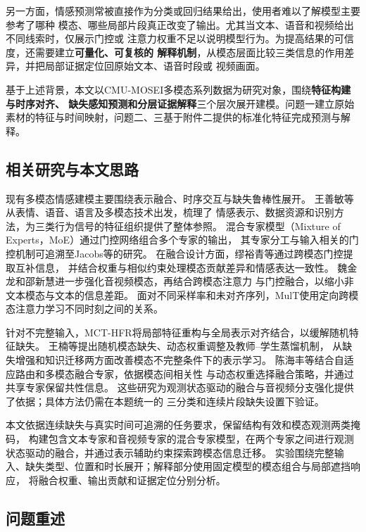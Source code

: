 \documentclass[bwprint]{gmcmthesis}
\begin{document}
另一方面，情感预测常被直接作为分类或回归结果给出，使用者难以了解模型主要参考了哪种
模态、哪些局部片段真正改变了输出。尤其当文本、语音和视频给出不同线索时，仅展示门控或
注意力权重不足以说明模型行为。为提高结果的可信度，还需要建立\textbf{可量化、可复核的
解释机制}，从模态层面比较三类信息的作用差异，并把局部证据定位回原始文本、语音时段或
视频画面。

基于上述背景，本文以CMU-MOSEI多模态系列数据为研究对象，围绕\textbf{特征构建与时序对齐、
缺失感知预测和分层证据解释}三个层次展开建模。问题一建立原始素材的特征与时间映射，问题二、三基于附件二提供的标准化特征完成预测与解释。

\subsection{相关研究与本文思路}
现有多模态情感建模主要围绕表示融合、时序交互与缺失鲁棒性展开。
王善敏等\citep{wang2025trimodal}从表情、语音、语言及多模态技术出发，梳理了
情感表示、数据资源和识别方法，为三类行为信号的特征组织提供了整体参照。
混合专家模型（Mixture of Experts，MoE）通过门控网络组合多个专家的输出，
其专家分工与输入相关的门控机制可追溯至Jacobs等的研究\citep{jacobs1991moe}。
在融合设计方面，缪裕青等\citep{miao2023gating}通过跨模态门控提取互补信息，
并结合权重与相似约束处理模态贡献差异和情感表达一致性。
魏金龙和邵新慧\citep{wei2024nontext}进一步强化音视频模态，再结合跨模态注意力
与门控融合，以缩小非文本模态与文本的信息差距。
面对不同采样率和未对齐序列，MulT使用定向跨模态注意力学习不同时刻之间的关系\citep{mult2019}。

针对不完整输入，MCT-HFR将局部特征重构与全局表示对齐结合，以缓解随机特征缺失\citep{mcthfr2024}。
王楠等提出随机模态缺失、动态权重调整及教师--学生蒸馏机制\citep{wang2025distill}，
从缺失增强和知识迁移两方面改善模态不完整条件下的表示学习。
陈海丰等\citep{chen2026experts}结合自适应路由和多模态融合专家，依据模态间相关性
与动态权重选择融合策略，并通过共享专家保留共性信息。
这些研究为观测状态驱动的融合与音视频分支强化提供了依据；具体方法仍需在本题统一的
三分类和连续片段缺失设置下验证。

本文依据连续缺失与真实时间可追溯的任务要求，保留结构有效和模态观测两类掩码，
构建包含文本专家和音视频专家的混合专家模型，在两个专家之间进行观测状态驱动的融合，并通过表示辅助约束探索跨模态信息迁移。
实验围绕完整输入、缺失类型、位置和时长展开；解释部分使用固定模型的模态组合与局部遮挡响应，
将融合权重、输出贡献和证据定位分别分析。

\subsection{问题重述}
\end{document}
